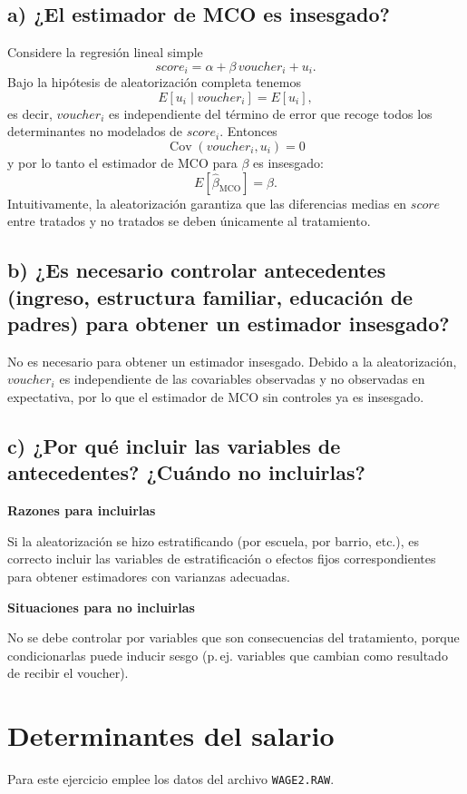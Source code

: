 \documentclass[12pt]{article}
\begin{document}
\subsection*{a) ¿El estimador de MCO es insesgado?}
Considere la regresión lineal simple
\[
score_i = \alpha + \beta\,voucher_i + u_i.
\]
Bajo la hipótesis de aleatorización completa tenemos
\[
E[u_i \mid voucher_i] = E[u_i],
\]
es decir, $voucher_i$ es independiente del término de error que recoge todos los determinantes no modelados de $score_i$. Entonces
\[
\operatorname{Cov}(voucher_i, u_i)=0
\]
y por lo tanto el estimador de MCO para $\beta$ es insesgado:
\[
E[\hat\beta_{\text{MCO}}]=\beta.
\]
Intuitivamente, la aleatorización garantiza que las diferencias medias en $score$ entre tratados y no tratados se deben únicamente al tratamiento.

\subsection*{b) ¿Es necesario controlar antecedentes (ingreso, estructura familiar, educación de padres) para obtener un estimador insesgado?}
No es necesario para obtener un estimador insesgado. Debido a la aleatorización, $voucher_i$ es independiente de las covariables observadas y no observadas en expectativa, por lo que el estimador de MCO sin controles ya es insesgado.

\subsection*{c) ¿Por qué incluir las variables de antecedentes? ¿Cuándo no incluirlas?}
\textbf{Razones para incluirlas}

Si la aleatorización se hizo estratificando (por escuela, por barrio, etc.), es correcto incluir las variables de estratificación o efectos fijos correspondientes para obtener estimadores con varianzas adecuadas.

\textbf{Situaciones para no incluirlas}

No se debe controlar por variables que son consecuencias del tratamiento, porque condicionarlas puede inducir sesgo (p.\,ej. variables que cambian como resultado de recibir el voucher).

\section{Determinantes del salario}

Para este ejercicio emplee los datos del archivo \texttt{WAGE2.RAW}.
\end{document}
